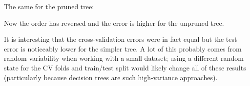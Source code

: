 \documentclass[
]{book}
\newenvironment{Shaded}{\begin{snugshade}}{\end{snugshade}}
\newcommand{\AttributeTok}[1]{\textcolor[rgb]{0.77,0.63,0.00}{#1}}
\newcommand{\CommentTok}[1]{\textcolor[rgb]{0.56,0.35,0.01}{\textit{#1}}}
\newcommand{\FunctionTok}[1]{\textcolor[rgb]{0.00,0.00,0.00}{#1}}
\newcommand{\NormalTok}[1]{#1}
\newcommand{\SpecialCharTok}[1]{\textcolor[rgb]{0.00,0.00,0.00}{#1}}
\newcommand{\StringTok}[1]{\textcolor[rgb]{0.31,0.60,0.02}{#1}}
\begin{document}
The same for the pruned tree:

\begin{Shaded}
\end{Shaded}

Now the order has reversed and the error is higher for the unpruned tree.

It is interesting that the cross-validation errors were in fact equal but the test error is noticeably lower for the simpler tree. A lot of this probably comes from random variability when working with a small dataset; using a different random state for the CV folds and train/test split would likely change all of these results (particularly because decision trees are such high-variance approaches).

  
\end{document}
